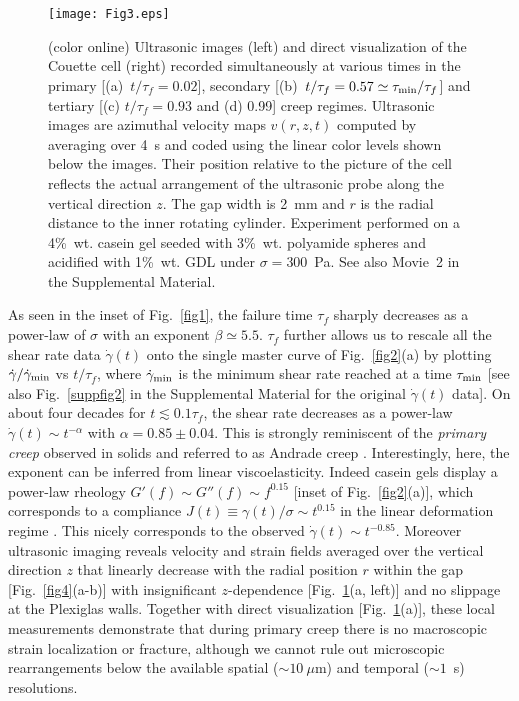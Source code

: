 \documentclass[twocolumn,superscriptaddress,showpacs,preprintnumbers,amsmath,amssymb,prl]{revtex4}
\newcommand\gp{\dot\gamma}
\newcommand\taum{\tau_{\rm min}}
\begin{document}
\begin{figure}[t]
\centering
\texttt{[image: Fig3.eps]}
\caption{(color online) Ultrasonic images (left) and direct visualization of the Couette cell (right) recorded simultaneously at various times in the primary [(a)~$t/\tau_f=0.02$], secondary [(b)~$t/\tau_f=0.57\simeq\taum/\tau_f$] and tertiary  [(c) $t/\tau_f=0.93$ and (d) 0.99] creep regimes. Ultrasonic images are azimuthal velocity maps $v(r,z,t)$ computed by averaging over 4~s and coded using the linear color levels shown below the images. Their position relative to the picture of the cell reflects the actual arrangement of the ultrasonic probe along the vertical direction $z$. The gap width is 2~mm and $r$ is the radial distance to the inner rotating cylinder. Experiment performed on a 4\%~wt. casein gel seeded with 3\%~wt. polyamide spheres and acidified with 1\%~wt. GDL under $\sigma=300$~Pa. See also Movie~2 in the Supplemental Material.
\label{fig3}}
\end{figure} 

As seen in the inset of Fig.~\ref{fig1}, the failure time $\tau_f$ sharply decreases as a power-law of $\sigma$ with an exponent $\beta\simeq 5.5$. $\tau_f$ further allows us to rescale all the shear rate data $\gp(t)$ onto the single master curve of Fig.~\ref{fig2}(a) by plotting $\gp/\gp_{\rm min}$ vs $t/\tau_f$, where $\gp_{\rm min}$ is the minimum shear rate reached at a time $\tau_{\rm min}$ [see also Fig.~\ref{suppfig2} in the Supplemental Material for the original $\gp(t)$ data]. On about four decades for $t\lesssim 0.1\tau_f$, the shear rate decreases as a power-law $\gp(t)\sim t^{-\alpha}$ with $\alpha=0.85\pm 0.04$. This is strongly reminiscent of the {\it primary creep} observed in solids and referred to as Andrade creep \cite{Andrade:1910,Miguel:2002,Nechad:2005,Rosti:2010}. Interestingly, here, the exponent can be inferred from linear viscoelasticity. Indeed casein gels display a power-law rheology $G'(f)\sim G''(f)\sim f^{0.15}$ [inset of Fig.~\ref{fig2}(a)], which corresponds to a compliance $J(t)\equiv\gamma(t)/\sigma\sim t^{0.15}$ in the linear deformation regime \cite{Tschoegl:1989}. This nicely corresponds to the observed $\gp(t)\sim t^{-0.85}$. Moreover ultrasonic imaging reveals velocity and strain fields averaged over the vertical direction $z$ that linearly decrease with the radial position $r$ within the gap [Fig.~\ref{fig4}(a-b)] with insignificant $z$-dependence [Fig.~\ref{fig3}(a, left)] and no slippage at the Plexiglas walls. Together with direct visualization [Fig.~\ref{fig3}(a)], these local measurements demonstrate that during primary creep there is no macroscopic strain localization or fracture, although we cannot rule out microscopic rearrangements below the available spatial ($\sim10~\mu$m) and temporal ($\sim1$~s) resolutions.
\end{document}
